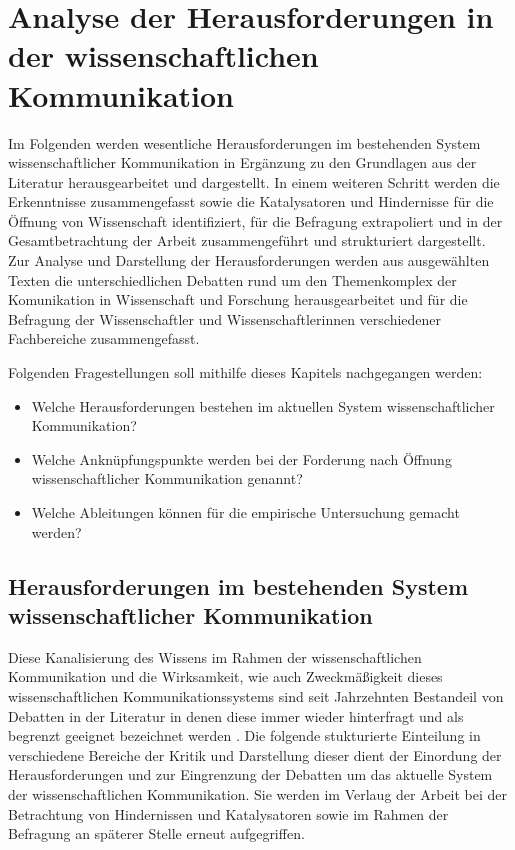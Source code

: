 \chapter{Analyse der Herausforderungen in der wissenschaftlichen Kommunikation}

Im Folgenden werden wesentliche Herausforderungen im bestehenden System wissenschaftlicher Kommunikation in Ergänzung zu den Grundlagen aus der Literatur herausgearbeitet und dargestellt. In einem weiteren Schritt werden die Erkenntnisse zusammengefasst sowie die Katalysatoren und Hindernisse für die Öffnung von Wissenschaft identifiziert, für die Befragung extrapoliert und in der Gesamtbetrachtung der Arbeit zusammengeführt und strukturiert dargestellt. Zur Analyse und Darstellung der Herausforderungen werden aus ausgewählten Texten die unterschiedlichen Debatten rund um den Themenkomplex der Komunikation in Wissenschaft und Forschung herausgearbeitet und für die Befragung der Wissenschaftler und Wissenschaftlerinnen verschiedener Fachbereiche zusammengefasst.

Folgenden Fragestellungen soll mithilfe dieses Kapitels nachgegangen werden:
\begin{itemize}
\item Welche Herausforderungen bestehen im aktuellen System wissenschaftlicher Kommunikation?
\item Welche Anknüpfungspunkte werden bei der Forderung nach Öffnung wissenschaftlicher Kommunikation genannt?
\item Welche Ableitungen können für die empirische Untersuchung gemacht werden?
\end{itemize}

\section{Herausforderungen im bestehenden System wissenschaftlicher Kommunikation}

Diese Kanalisierung des Wissens im Rahmen der wissenschaftlichen Kommunikation und die Wirksamkeit, wie auch Zweckmäßigkeit dieses wissenschaftlichen Kommunikationssystems sind seit Jahrzehnten Bestandeil von Debatten in der Literatur \cite{Simon_2009} in denen diese immer wieder hinterfragt und als begrenzt geeignet bezeichnet werden \cite{Hornbostel_1997} \cite{Hicks_1996} \cite{Havemann_2002} \cite{Warnke_2012} \cite{Brembs_2013a}. Die folgende stukturierte Einteilung in verschiedene Bereiche der Kritik und Darstellung dieser dient der Einordung der Herausforderungen und zur Eingrenzung der Debatten um das aktuelle System der wissenschaftlichen Kommunikation. Sie werden im Verlaug der Arbeit bei der Betrachtung von Hindernissen und Katalysatoren sowie im Rahmen der Befragung an späterer Stelle erneut aufgegriffen.

